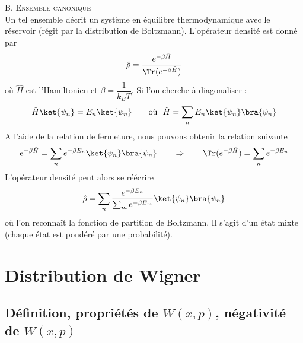 \textsc{B. Ensemble canonique}\\
Un tel ensemble décrit un système en équilibre thermodynamique avec le réservoir (régit par la distribution de 
Boltzmann). L'opérateur densité est donné par
\begin{equation}
\hat{\rho} = \dfrac{e^{-\beta\hat{H}}}{\Tr(e^{-\beta\hat{H}})}
\end{equation}
où $\hat{H}$ est l'Hamiltonien et $\beta = \dfrac{1}{k_BT}$. Si l'on cherche à diagonaliser :
\begin{equation}
\hat{H}\ket{\psi_n} = E_n\ket{\psi_n}\qquad \text{où }\ \hat{H} = \sum_n E_n\ket{\psi_n}\bra{\psi_n}
\end{equation}
A l'aide de la relation de fermeture, nous pouvons obtenir la relation suivante
\begin{equation}
e^{-\beta\hat{H}} = \sum_n e^{-\beta E_n}\ket{\psi_n}\bra{\psi_n}\qquad\Rightarrow\qquad \Tr(e^{-\beta \hat{H}}) = 
\sum_n e^{-\beta E_n}
\end{equation}
L'opérateur densité peut alors se réécrire
\begin{equation}
\hat{\rho} = \sum_n \dfrac{e^{-\beta E_n}}{\sum_m e^{-\beta E_m}} \ket{\psi_n}\bra{\psi_n}
\end{equation}
où l'on reconnaît la fonction de partition de Boltzmann. Il s'agit d'un état mixte (chaque état est pondéré par
une probabilité). 

 

\section{Distribution de Wigner}
\subsection{Définition, propriétés de $W(x,p)$, négativité de $W(x,p)$}
